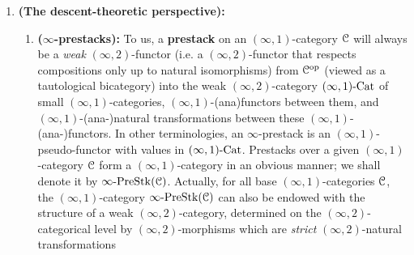                 \begin{convention} \label{conv: infinity_prestacks}  
                    \noindent
                    \begin{enumerate}
                        \item \textbf{(The descent-theoretic perspective):} \begin{enumerate}
                            \item \textbf{($\infty$-prestacks):} To us, a \textbf{prestack} on an $(\infty, 1)$-category $\mathcal{C}$ will always be a \textit{weak} $(\infty, 2)$-functor (i.e. a $(\infty, 2)$-functor that respects compositions only up to natural isomorphisms) from $\mathcal{C}^{\mathrm{op}}$ (viewed as a tautological bicategory) into the weak $(\infty, 2)$-category $(\infty, 1)\text{-}\mathrm{Cat}$ of small $(\infty, 1)$-categories, $(\infty, 1)$-(ana)functors between them, and $(\infty, 1)$-(ana-)natural transformations between these $(\infty, 1)$-(ana-)functors. In other terminologies, an $\infty$-prestack is an $(\infty, 1)$-pseudo-functor with values in $(\infty, 1)\text{-}\mathrm{Cat}$. Prestacks over a given $(\infty, 1)$-category $\mathcal{C}$ form a $(\infty, 1)$-category in an obvious manner; we shall denote it by $\infty\text{-}\mathrm{Pre}\mathrm{Stk}(\mathcal{C})$. Actually, for all base $(\infty, 1)$-categories $\mathcal{C}$, the $(\infty, 1)$-category $\infty\text{-}\mathrm{Pre}\mathrm{Stk}(\mathcal{C})$ can also be endowed with the structure of a weak $(\infty, 2)$-category, determined on the $(\infty, 2)$-categorical level by $(\infty, 2)$-morphisms which are \textit{strict} $(\infty, 2)$-natural transformations
                            

\end{enumerate}
\end{enumerate}
\end{convention}
